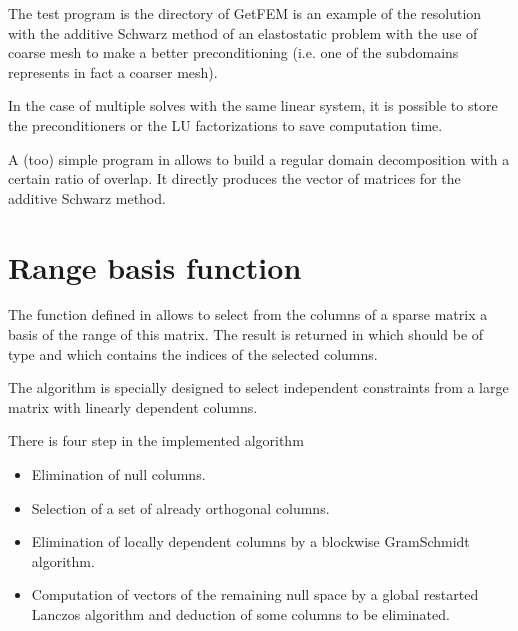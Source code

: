 \documentclass[a4paper,11pt,english]{sphinxmanual}
\begin{document}
The test program  is the directory  of GetFEM is an example of the resolution with the additive Schwarz method of an elastostatic problem with the use of coarse mesh to make a better preconditioning (i.e. one of the sub\sphinxhyphen{}domains represents in fact a coarser mesh).

In the case of multiple solves with the same linear system, it is possible to store the preconditioners or the LU factorizations to save computation time.

A (too) simple program in  allows to build a regular domain decomposition with a certain ratio of overlap. It directly produces the vector of matrices  for the additive Schwarz method.


\section{Range basis function}
\label{\detokenize{gmm/iter:range-basis-function}}
The function  defined in  allows to select from the columns of a sparse matrix  a basis of the range of this matrix. The result is returned in  which should be of type  and which contains the indices of the selected columns.

The algorithm is specially designed to select independent constraints from a large matrix with linearly dependent columns.

There is four step in the implemented algorithm
\begin{itemize}
\item {} 
Elimination of null columns.

\item {} 
Selection of a set of already orthogonal columns.

\item {} 
Elimination of locally dependent columns by a blockwise Gram\sphinxhyphen{}Schmidt algorithm.

\item {} 
Computation of vectors of the remaining null space by a global restarted Lanczos algorithm and deduction of some columns to be eliminated.

\end{itemize}
\end{document}
